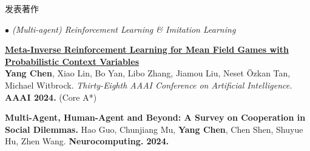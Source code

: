\documentclass{resume} %
\begin{document}
\begin{rSection}{发表著作}
\begin{rSubsection}{\large\em $\bullet$ (Multi-agent) Reinforcement Learning \& Imitation Learning}{}{}{}
	\item {\href{https://ojs.aaai.org/index.php/AAAI/article/view/29021}{\bf Meta-Inverse Reinforcement Learning for Mean Field Games with Probabilistic Context Variables}}\\
		\textbf{\bf Yang Chen}, Xiao Lin, Bo Yan, Libo Zhang, Jiamou Liu, Neset \"{O}zkan Tan, Michael Witbrock. {\em Thirty-Eighth AAAI Conference on Artificial Intelligence.} \textbf{AAAI 2024.} (Core A*)\\
	\item {\bf Multi-Agent, Human-Agent and Beyond: A Survey on Cooperation in Social Dilemmas.} Hao Guo, Chunjiang Mu, \textbf{Yang Chen}, Chen Shen, Shuyue Hu, Zhen Wang. \textbf{Neurocomputing. 2024.}
	

\end{rSubsection}
\end{rSection}
\end{document}
